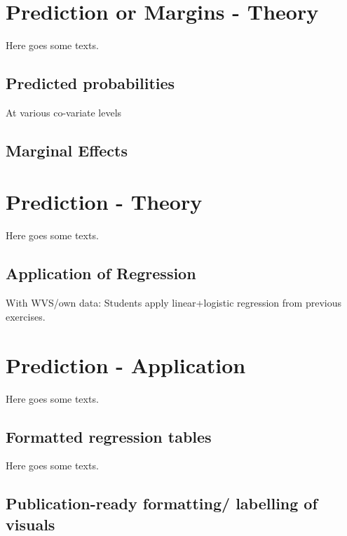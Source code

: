 \documentclass[
]{book}
\begin{document}
\hypertarget{med}{%
\chapter{Prediction or Margins - Theory}\label{med}}

Here goes some texts.

\hypertarget{predicted-probabilities}{%
\section{Predicted probabilities}\label{predicted-probabilities}}

At various co-variate levels

\hypertarget{marginal-effects}{%
\section{Marginal Effects}\label{marginal-effects}}

\hypertarget{pm-t}{%
\chapter{Prediction - Theory}\label{pm-t}}

Here goes some texts.

\hypertarget{application-of-regression}{%
\section{Application of Regression}\label{application-of-regression}}

With WVS/own data: Students apply linear+logistic regression from previous exercises.

\hypertarget{pm-a}{%
\chapter{Prediction - Application}\label{pm-a}}

Here goes some texts.

\hypertarget{formatted-regression-tables}{%
\section{Formatted regression tables}\label{formatted-regression-tables}}

Here goes some texts.

\hypertarget{publication-ready-formatting-labelling-of-visuals}{%
\section{Publication-ready formatting/ labelling of visuals}\label{publication-ready-formatting-labelling-of-visuals}}
\end{document}
